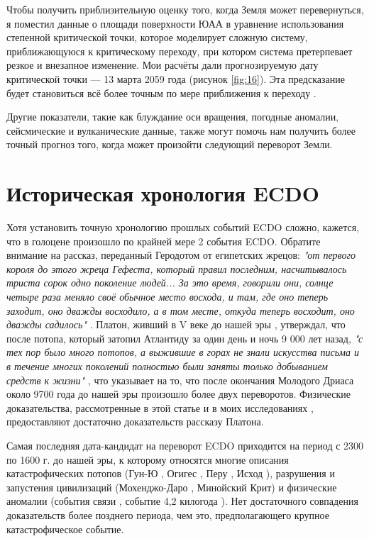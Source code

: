 \documentclass[10pt,twocolumn,letterpaper]{article}
\begin{document}
Чтобы получить приблизительную оценку того, когда Земля может перевернуться, я поместил данные о площади поверхности ЮАА в уравнение использования степенной критической точки, которое моделирует сложную систему, приближающуюся к критическому переходу, при котором система претерпевает резкое и внезапное изменение. Мои расчёты дали прогнозируемую дату критической точки — 13 марта 2059 года (рисунок \ref{fig:16}). Эта предсказание будет становиться всё более точным по мере приближения к переходу \cite{136}.

Другие показатели, такие как блуждание оси вращения, погодные аномалии, сейсмические и вулканические данные, также могут помочь нам получить более точный прогноз того, когда может произойти следующий переворот Земли.

\section{Историческая хронология ECDO}

Хотя установить точную хронологию прошлых событий ECDO сложно, кажется, что в голоцене произошло по крайней мере 2 события ECDO. Обратите внимание на рассказ, переданный Геродотом от египетских жрецов: \textit{"от первого короля до этого жреца Гефеста, который правил последним, насчитывалось триста сорок одно поколение людей... За это время, говорили они, солнце четыре раза меняло своё обычное место восхода, и там, где оно теперь заходит, оно дважды восходило, а в том месте, откуда теперь восходит, оно дважды садилось"} \cite{32}. Платон, живший в V веке до нашей эры \cite{111}, утверждал, что после потопа, который затопил Атлантиду за один день и ночь 9 000 лет назад, \textit{"с тех пор было много потопов, а выжившие в горах не знали искусства письма и в течение многих поколений полностью были заняты только добыванием средств к жизни"} \cite{112}, что указывает на то, что после окончания Молодого Дриаса около 9700 года до нашей эры произошло более двух переворотов. Физические доказательства, рассмотренные в этой статье и в моих исследованиях \cite{2}, предоставляют достаточно доказательств рассказу Платона.

Самая последняя дата-кандидат на переворот ECDO приходится на период с 2300 по 1600 г. до нашей эры, к которому относятся многие описания катастрофических потопов (Гун-Ю \cite{113,114,115}, Огигес \cite{116,117}, Перу \cite{118,119}, Исход \cite{120}), разрушения и запустения цивилизаций (Мохенджо-Даро \cite{121}, Минойский Крит\cite{100,101}) и физические аномалии (события связи \cite{122}, событие 4,2 килогода \cite{90}). Нет достаточного совпадения доказательств более позднего периода, чем это, предполагающего крупное катастрофическое событие.
\end{document}
